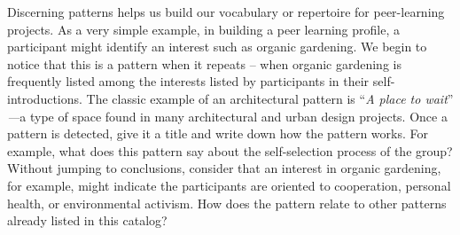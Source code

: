 Discerning patterns helps us build our vocabulary or repertoire for
peer-learning projects. As a very simple example, in building a peer
learning profile, a participant might identify an interest such as
organic gardening. We begin to notice that this is a pattern when it
repeats -- when organic gardening is frequently listed among the
interests listed by participants in their self-introductions. The
classic example of an architectural pattern is ``\emph{A place to wait}''
\emph{---}a type of space found in many architectural and urban design
projects. Once a pattern is detected, give it a title and write down how
the pattern works. For example, what does this pattern say about the
self-selection process of the group? Without jumping to conclusions,
consider that an interest in organic gardening, for example, might
indicate the participants are oriented to cooperation, personal health,
or environmental activism. How does the pattern relate to other patterns
already listed in this catalog?
